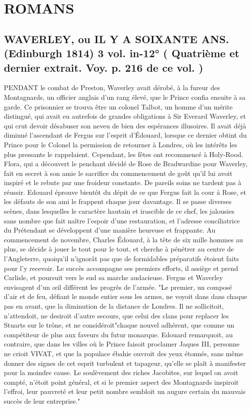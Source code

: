 \setcounter{page}{359}
\chapter{ROMANS}
\section{WAVERLEY, ou IL Y A SOIXANTE ANS. (Edinburgh 1814) 3 vol. in-12° \large{( Quatrième et dernier extrait. Voy. p. 216 de ce vol. )}}
PENDANT le combat de Preston, Waverley avait dérobé, à la fureur des Montagnards, un officier anglais d'un rang élevé, que le Prince confia ensuite à sa garde. Ce prisonnier se trouva être un colonel Talbot, un homme d'un mérite distingué, qui avait eu autrefois de grandes obligations à Sir Everard Waverley, et qui crut devoir désabuser son neveu de bien des espérances illusoires. Il avait déjà diminué l'ascendant de Fergus sur l'esprit d'Édouard, lorsque ce dernier obtint du Prince pour le Colonel la permission de retourner à Londres, où les intérêts les plus pressants le rappelaient. Cependant,\setcounter{page}{360} les fêtes ont recommencé à Holy-Rood. Flora, qui a découvert le penchant décidé de Rose de Bradwardine pour Waverley, fait en secret à son amie le sacrifice du commencement de goût qu'il lui avoit inspiré et le rebute par une froideur constante. De pareils soins ne tardent pas à réussir. Edouard éprouve bientôt du dépit de ce que Fergus fait la cour à Rose, et les défauts de son ami le frappent chaque jour davantage. Il se passe diverses scènes, dans lesquelles le caractère hautain et irascible de ce chef, les jalousies sans nombre que fait naître l'espoir d'une restauration, et l'adresse conciliatrice du Prétendant se développent d'une manière heureuse et frappante. Au commencement de novembre, Charles Édouard, à la tête de six mille hommes au plus, se décide à jouer le tout pour le tout, et cherche à pénétrer au centre de l'Angleterre, quoiqu'il n'ignorât pas que de formidables préparatifs étoient faits pour l'y recevoir. Le succès accompagne ses premiers efforts, il assiège et prend Carlisle, et poursuit vers le sud sa marche audacieuse. Fergus et Waverley envisagent d'un œil différent les progrès de l'armée. "Le premier, un composé d'air et de feu, défiant le monde entier sous les armes, ne voyoit dans\setcounter{page}{361} dans chaque pas en avant, que la diminution de la distance de Londres. Il ne sollicitoit, n'attendoit, ne desiroit d'autre secours, que celui des clans pour replacer les Stuarts sur le trône, et ne considéroit"chaque nouvel adhérent, que comme un compétiteur de plus aux faveurs du futur monarque. Edouard remarquoit, au contraire, que dans les villes où le Prince faisoit proclamer Jaques III, personne ne crioit VIVAT, et que la populace ébahie ouvroit des yeux étonnés, sans même donner des signes de cet esprit turbulent et tapageur, qu'elle se plaît à manifester pour la moindre cause. Le soulèvement des riches Jacobites, sur lequel on avoit compté, n'étoit point général, et si le premier aspect des Montagnards inspiroit l'effroi, leur pauvreté et leur petit nombre sembloit un augure certain du mauvais succès de leur entreprise."

